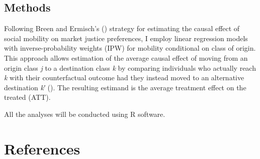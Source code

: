 \documentclass[
  12pt,
]{article}
\begin{document}
\subsection{Methods}\label{methods}

Following Breen and Ermisch's ()
strategy for estimating the causal effect of social mobility on market
justice preferences, I employ linear regression models with
inverse-probability weights (IPW) for mobility conditional on class of
origin. This approach allows estimation of the average causal effect of
moving from an origin class \emph{j} to a destination class \emph{k} by
comparing individuals who actually reach \emph{k} with their
counterfactual outcome had they instead moved to an alternative
destination \emph{k′} (). The resulting estimand is the average treatment effect
on the treated (ATT).

All the analyses will be conducted using R software.

\section{References}\label{references}
\end{document}
